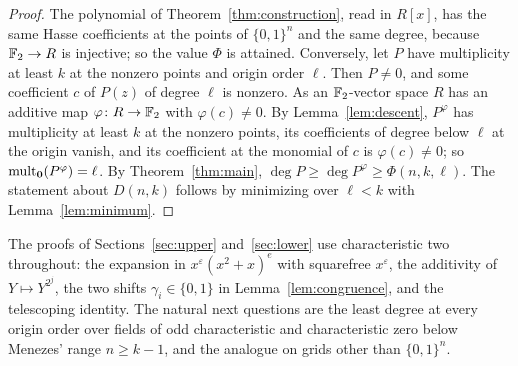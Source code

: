 \begin{proof}
The polynomial of Theorem~\ref{thm:construction}, read in \(R[x]\), has the same
Hasse coefficients at the points of \(\{0,1\}^n\) and the same degree, because
\(\mathbb F_2\to R\) is injective; so the value \(\Phi\) is attained. Conversely, let \(P\)
have multiplicity at least \(k\) at the nonzero points and origin order \(\ell\).
Then \(P\ne0\), and some coefficient \(c\) of \(P(z)\) of degree \(\ell\) is
nonzero. As an \(\mathbb F_2\)-vector space \(R\) has an additive map \(\varphi\colon R\to\mathbb F_2\)
with \(\varphi(c)\ne0\). By Lemma~\ref{lem:descent}, \(P^\varphi\) has multiplicity
at least \(k\) at the nonzero points, its coefficients of degree below \(\ell\) at
the origin vanish, and its coefficient at the monomial of \(c\) is
\(\varphi(c)\ne0\); so \(\operatorname{mult}_{\mathbf 0}(P^\varphi)=\ell\). By Theorem~\ref{thm:main},
\(\deg P\ge\deg P^\varphi\ge\Phi(n,k,\ell)\). The statement about \(D(n,k)\) follows
by minimizing over \(\ell<k\) with Lemma~\ref{lem:minimum}.
\end{proof}

\begin{remark}\label{rem:open}
The proofs of Sections~\ref{sec:upper} and~\ref{sec:lower} use characteristic two
throughout: the expansion in \(x^\varepsilon(x^2+x)^e\) with squarefree
\(x^\varepsilon\), the additivity of \(Y\mapsto Y^{2^j}\), the two shifts
\(\gamma_i\in\{0,1\}\) in Lemma~\ref{lem:congruence}, and the telescoping identity.
The natural next questions are the least degree at every origin order over
fields of odd characteristic and characteristic zero below Menezes' range
\(n\ge k-1\), and the analogue on grids other than \(\{0,1\}^n\).
\end{remark}
